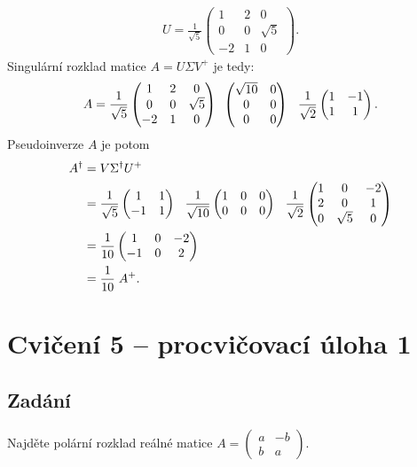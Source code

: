 \documentclass[]{article}
\newcommand{\mat}[1]{\begin{pmatrix}#1\end{pmatrix}}
\newcommand{\recip}[1]{\frac{1}{#1}}
\newcommand{\recipsqrt}[1]{\frac{1}{\sqrt{#1}}}
\begin{document}
\begin{align*}
  U = \recipsqrt{5} \mat{1&2&0 \\ 0&0&\sqrt{5} \\ -2&1&0}.
\end{align*}
Singulární rozklad matice $A = U\Sigma V^+$ je tedy:
\begin{align*}
  A =
  \recipsqrt{5} \mat{1&2&0 \\ 0&0&\sqrt{5} \\ -2&1&0}
  \hspace{.5em}
  \mat{\sqrt{10} & 0 \\ 0 & 0 \\ 0 & 0}
  \hspace{.7em}
  \recipsqrt{2} \mat{1 & -1 \\ 1 & 1}.
\end{align*}
Pseudoinverze $A$ je potom
\begin{align*}
  A^\dagger &= V \Sigma^\dagger U^+ \\
  &= \recipsqrt{5} \mat{1&1\\-1&1}
  \hspace{.7em}
  \recipsqrt{10} \mat{1&0&0\\0&0&0}
  \hspace{.7em}
  \recipsqrt{2} \mat{1&0&-2\\2&0&1\\0&\sqrt{5}&0} \\
  &= \recip{10} \mat{1&0&-2\\-1&0&2} \\
  &= \recip{10} \; A^+.
\end{align*}



\section{Cvičení 5 – procvičovací úloha 1}
\subsection{Zadání}
Najděte polární rozklad reálné matice $A=\mat{a&-b\\b&a}$.
\end{document}
